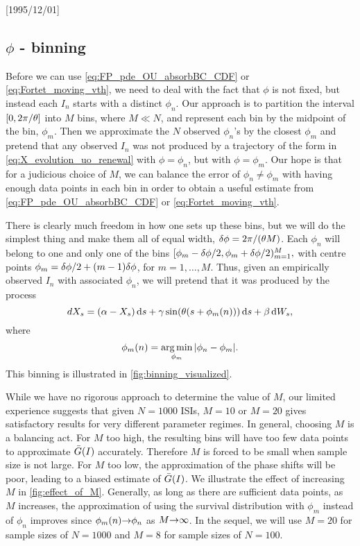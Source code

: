 \NeedsTeXFormat{LaTeX2e}[1995/12/01] \documentclass[10pt]{bmc_article}
\newenvironment{bmcformat}{\begin{raggedright}\baselineskip20pt\sloppy\setboolean{publ}{false}}{\end{raggedright}\baselineskip20pt\sloppy}
\begin{document}
\begin{bmcformat}
\subsection{$\phi$ - binning}
Before we can use \cref{eq:FP_pde_OU_absorbBC_CDF} or
\eqref{eq:Fortet_moving_vth}, we need to deal with the fact that $\phi$ is not
fixed, but instead each $I_n$ starts with a distinct $\phi_n$. Our approach is
to partition the interval $[0, 2 \pi/{\theta}]$ into $M$ bins, where $M \ll N$, and
represent each bin by the midpoint of the bin, $\phi_m$. Then we approximate the
$N$ observed $\phi_n$'s by the closest $\phi_m$ and pretend that any observed
$I_n$ was not produced by a trajectory of the form in
\cref{eq:X_evolution_uo_renewal} with $\phi = \phi_n$, but with $\phi = \phi_m$.
Our hope is that for a judicious choice of $M$, we can balance the error of
$\phi_n \neq \phi_m$ with having enough data points in each bin in order to
obtain a useful estimate from \cref{eq:FP_pde_OU_absorbBC_CDF} or
\eqref{eq:Fortet_moving_vth}.

There is clearly much freedom in how one sets up these bins, but we will do the
simplest thing and make them all of equal width, ${ \delta \phi } = 2 \pi / {({\theta} M)}$.
Each $\phi_n$ will belong to one and only one of the bins $ [\phi_m - { \delta \phi }/2,
\phi_m + { \delta \phi }/2)_{m=1}^M, $ with centre points $ \phi_m = { \delta \phi } / 2 + (m-1)
{ \delta \phi }$, for $m = 1,\ldots, M$. Thus, given an empirically observed $I_n$ with
associated $\phi_n$, we will pretend that it was produced by the process $$ dX_s
= ({\alpha} - X_s) \, \mathrm{d} s  + {\gamma } \sin({\theta} (s+\phi_m(n) ))
\, \mathrm{d} s
+ {\beta} \, \mathrm{d} W_s, $$ where $$ \phi_m(n)  = \argmin_{\phi_m} {| \phi_n - \phi_m|}.
$$ This binning is illustrated in \cref{fig:binning_visualized}.

While we have no rigorous approach to determine the value of $M$, our limited
experience suggests that given $N=1000$ ISIs, $M=10$ or $M=20$ gives satisfactory
results for very different parameter regimes. In general, choosing $M$ is a
balancing act. For $M$ too high, the resulting bins will have too few data
points to approximate ${ \bar{G} }(I)$ accurately. Therefore $M$ is forced to be small
when sample size is not large. For $M$ too low, the approximation of the phase
shifts will be poor, leading to a biased estimate of ${ \bar{G} }(I)$. We illustrate the
effect of increasing $M$ in \cref{fig:effect_of_M}. Generally, as long as there
are sufficient data points, as $M$ increases, the approximation of using the
survival distribution with $\phi_m$ instead of $\phi_n$ improves since
$\phi_m(n) {\rightarrow} \phi_n$ as $M {\rightarrow} \infty$. In the sequel, we will use $M=20$ for
sample sizes of $N=1000$ and $M=8$ for sample sizes of $N=100$.



\end{bmcformat}
\end{document}

